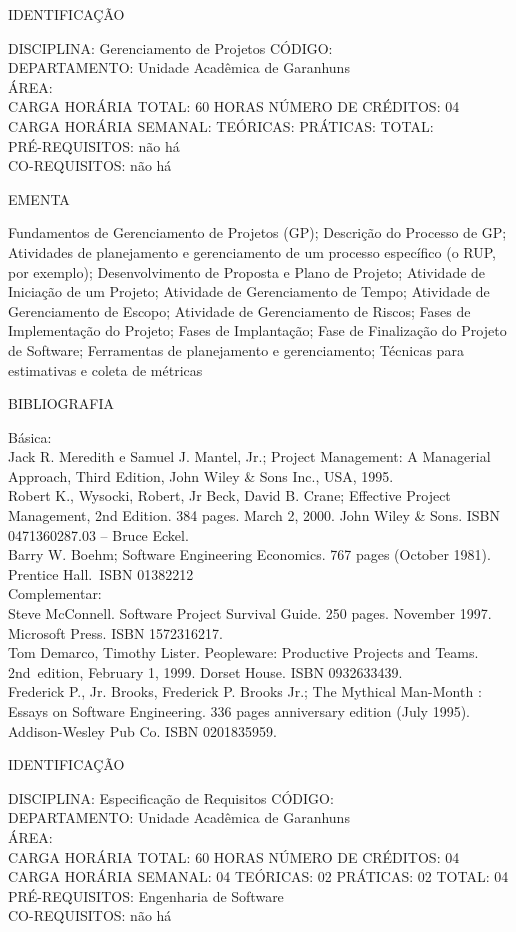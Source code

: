 \documentclass[
	12pt,				%
	openright,			%
  oneside,     %
	a4paper,			%
	english,			%
	french,				%
	spanish,			%
	brazil				%
	]{abntex2}
\begin{document}
\begin{apendicesenv}
\newpage IDENTIFICAÇÃO

DISCIPLINA: Gerenciamento de Projetos CÓDIGO:\\ 
DEPARTAMENTO: Unidade Acadêmica de Garanhuns\\
ÁREA: \\
CARGA HORÁRIA TOTAL: 60 HORAS NÚMERO DE CRÉDITOS: 04\\
CARGA HORÁRIA SEMANAL: TEÓRICAS: PRÁTICAS: TOTAL: \\
PRÉ-REQUISITOS: não há\\
CO-REQUISITOS: não há

EMENTA 

Fundamentos de Gerenciamento de Projetos (GP); Descrição do Processo de GP; Atividades de planejamento e gerenciamento de um processo específico (o RUP, por exemplo); Desenvolvimento de Proposta e Plano de Projeto; Atividade de Iniciação de um Projeto; Atividade de Gerenciamento de Tempo; Atividade de Gerenciamento de Escopo; Atividade de Gerenciamento de Riscos; Fases de Implementação do Projeto; Fases de Implantação; Fase de Finalização do Projeto de Software; Ferramentas de planejamento e gerenciamento; Técnicas para estimativas e coleta de métricas

BIBLIOGRAFIA 

Básica:\\
Jack R. Meredith e Samuel J. Mantel, Jr.; Project Management: A
Managerial Approach, Third Edition, John Wiley \& Sons Inc., USA,
1995.\\
Robert K., Wysocki, Robert, Jr Beck, David B. Crane; Effective Project
Management, 2nd Edition. 384 pages. March 2, 2000. John Wiley \& Sons.
ISBN 0471360287.03 -- Bruce Eckel.\\
Barry W. Boehm; Software Engineering Economics. 767 pages (October
1981). Prentice Hall.~ISBN 01382212\\
Complementar:\\
Steve McConnell. Software Project Survival Guide. 250 pages. November
1997. Microsoft Press. ISBN 1572316217.\\
Tom Demarco, Timothy Lister. Peopleware: Productive Projects and Teams.
2nd~edition, February 1, 1999. Dorset House. ISBN 0932633439.\\
Frederick P., Jr. Brooks, Frederick P. Brooks Jr.; The Mythical
Man-Month : Essays on Software Engineering. 336 pages anniversary
edition (July 1995). Addison-Wesley Pub Co. ISBN 0201835959.\

\newpage IDENTIFICAÇÃO

DISCIPLINA: Especificação de Requisitos CÓDIGO:\\ 
DEPARTAMENTO: Unidade Acadêmica de Garanhuns\\ 
ÁREA: \\
CARGA HORÁRIA TOTAL: 60 HORAS NÚMERO DE CRÉDITOS: 04\\
CARGA HORÁRIA SEMANAL: 04 TEÓRICAS: 02 PRÁTICAS: 02 TOTAL: 04\\
PRÉ-REQUISITOS: Engenharia de Software\\
CO-REQUISITOS: não há


\end{apendicesenv}
\end{document}
